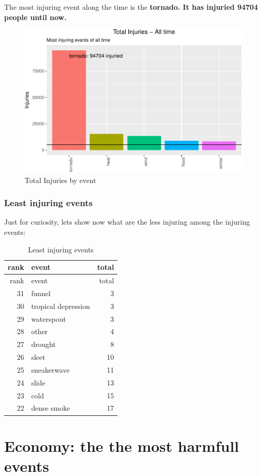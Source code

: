 \documentclass[]{article}
\begin{document}
The most injuring event along the time is the \textbf{tornado. It has
injuried 94704 people until now.}

\begin{figure}[htbp]
\centering
\includegraphics{readme_files/figure-latex/injuring-all-plot-1.pdf}
\caption{Total Injuries by event}
\end{figure}

\subsubsection{Least injuring events}\label{least-injuring-events}

Just for curiosity, lets show now what are the less injuring among the
injuring events:

\begin{longtable}[]{@{}rlr@{}}
\caption{Least injuring events}\tabularnewline
\toprule
rank & event & total\tabularnewline
\midrule
\endfirsthead
\toprule
rank & event & total\tabularnewline
\midrule
\endhead
31 & funnel & 3\tabularnewline
30 & tropical depression & 3\tabularnewline
29 & waterspout & 3\tabularnewline
28 & other & 4\tabularnewline
27 & drought & 8\tabularnewline
26 & sleet & 10\tabularnewline
25 & sneakerwave & 11\tabularnewline
24 & slide & 13\tabularnewline
23 & cold & 15\tabularnewline
22 & dense smoke & 17\tabularnewline
\bottomrule
\end{longtable}

\section{Economy: the the most harmfull
events}\label{economy-the-the-most-harmfull-events}
\end{document}

